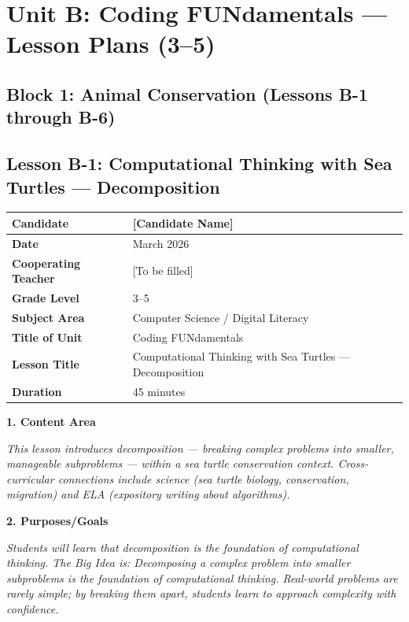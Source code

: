 \documentclass[11pt,letterpaper]{article}
\begin{document}
\newpage
\section{Unit B: Coding FUNdamentals --- Lesson Plans (3--5)}
\label{sec:UnitBCodingFUNdamentalsLessonPlans35}

\subsection{Block 1: Animal Conservation (Lessons B-1 through B-6)}
\label{sub:Block1AnimalConservationLessonsB1throughB6}

\subsection{Lesson B-1: Computational Thinking with Sea Turtles --- Decomposition}
\label{sub:LessonB1ComputationalThinkingwithSeaTurtlesDecomposition}

\begin{longtable}{|L{0.28\textwidth}|L{0.65\textwidth}|}
\hline
\textbf{Candidate}  & [Candidate Name]  \\
\hline
\textbf{Date}  & March 2026  \\
\hline
\textbf{Cooperating Teacher}  & [To be filled]  \\
\hline
\textbf{Grade Level}  & 3--5  \\
\hline
\textbf{Subject Area}  & Computer Science / Digital Literacy  \\
\hline
\textbf{Title of Unit}  & Coding FUNdamentals  \\
\hline
\textbf{Lesson Title}  & Computational Thinking with Sea Turtles --- Decomposition  \\
\hline
\textbf{Duration}  & 45 minutes  \\
\hline
\end{longtable}

\textbf{1. Content Area}

\textit{This lesson introduces decomposition --- breaking complex problems into smaller, manageable subproblems --- within a sea turtle conservation context. Cross-curricular connections include science (sea turtle biology, conservation, migration) and ELA (expository writing about algorithms).}

\textbf{2. Purposes/Goals}

\textit{Students will learn that decomposition is the foundation of computational thinking. The Big Idea is: Decomposing a complex problem into smaller subproblems is the foundation of computational thinking. Real-world problems are rarely simple; by breaking them apart, students learn to approach complexity with confidence.}
\end{document}
